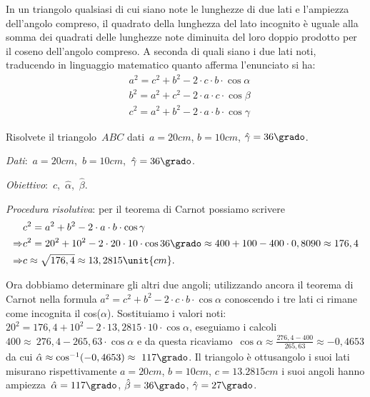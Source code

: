 \begin{teorema}
In un triangolo qualsiasi di cui siano note le lunghezze di due lati e 
l'ampiezza dell'angolo compreso, il quadrato della lunghezza
del lato incognito è uguale alla somma dei quadrati delle lunghezze note 
diminuita del loro doppio prodotto per il coseno dell'angolo compreso.
A seconda di quali siano i due lati noti, traducendo in linguaggio matematico 
quanto afferma l'enunciato si ha:
\begin{align*}
&a^{2}=c^{2}+b^{2}-2\cdot c\cdot b\cdot \cos \alpha\\
&b^{2}=a^{2}+c^{2}-2\cdot a\cdot c\cdot \cos  \beta\\
&c^{2}=a^{2}+b^{2}-2\cdot a\cdot b\cdot \cos \gamma
\end{align*}
\end{teorema}

\begin{problema}
Risolvete il triangolo~$ABC$ dati~$a= 20\unit{cm}$, $b=10\unit{cm}$, 
${\hat{\gamma}}=36\grado$.
\end{problema}

\emph{Dati}:~$a= 
20\unit{cm}$,\quad~$b=10\unit{cm}$,\quad~${\hat{\gamma}}=36\grado$.

\emph{Obiettivo}:~$c$,\quad~$\hat{\alpha}$,\quad~$\hat{\beta}$.

\emph{Procedura risolutiva}:
per il teorema di Carnot possiamo scrivere
\begin{align*}
&c^{2}=a^{2}+b^{2}-2\cdot a\cdot b\cdot \cos  \gamma\\
\Rightarrow &c^{2}=20^{2}+10^{2}-2\cdot 20\cdot 10\cdot 
\cos 36\grado \approx400+100-400\cdot 0,8090\approx176,4\\
\Rightarrow &c\approx\sqrt{176,4}\approx13,2815\unit{cm}.
\end{align*}

Ora dobbiamo determinare gli altri due angoli; utilizzando ancora il teorema 
di 
Carnot nella formula
$a^{2}=c^{2}+b^{2}-2\cdot c\cdot b\cdot \cos  \alpha$ 
conoscendo i tre lati ci rimane come incognita il cos(${\alpha}$). 
Sostituiamo i valori noti:~$20^{2}=176,4+10^{2}-2\cdot 
13,2815\cdot 10\cdot \cos  \alpha$, eseguiamo i calcoli
$400\approx~276,4-265,63\cdot \cos  \alpha$ e da questa ricaviamo~$\cos  
\alpha\approx \frac{276,4-400}{265,63}\approx-0,4653$ da cui
$\hat{\alpha}\approx\cos ^{-1}(-0,4653)\approx~117\grado$. Il triangolo è 
ottusangolo i suoi lati misurano rispettivamente
$a=20\unit{cm}$, $b=10\unit{cm}$, $c=13.2815\unit{cm}$ i suoi angoli hanno 
ampiezza~$\hat{\alpha} =117\grado$, $\hat{\beta} =36\grado$, $\hat{\gamma} 
=27\grado$.

